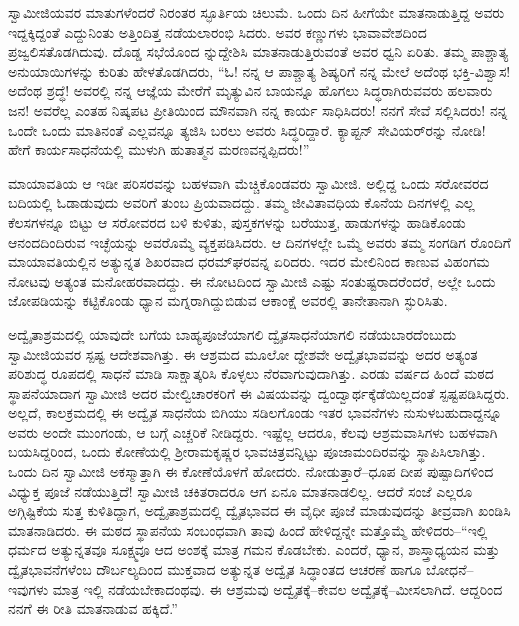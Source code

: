 ಸ್ವಾಮೀಜಿಯವರ ಮಾತುಗಳೆಂದರೆ ನಿರಂತರ ಸ್ಫೂರ್ತಿಯ ಚಿಲುಮೆ. ಒಂದು ದಿನ ಹೀಗೆಯೇ ಮಾತನಾಡುತ್ತಿದ್ದ ಅವರು ಇದ್ದಕ್ಕಿದ್ದಂತೆ ಎದ್ದುನಿಂತು ಅತ್ತಿಂದಿತ್ತ ನಡೆಯಲಾರಂಭಿ ಸಿದರು. ಅವರ ಕಣ್ಣುಗಳು ಭಾವಾವೇಶದಿಂದ ಪ್ರಜ್ವಲಿಸತೊಡಗಿದುವು. ದೊಡ್ಡ ಸಭೆಯೊಂದ ನ್ನುದ್ದೇಶಿಸಿ ಮಾತನಾಡುತ್ತಿರುವಂತೆ ಅವರ ಧ್ವನಿ ಏರಿತು. ತಮ್ಮ ಪಾಶ್ಚಾತ್ಯ ಅನುಯಾಯಿಗಳನ್ನು ಕುರಿತು ಹೇಳತೊಡಗಿದರು, “ಓ! ನನ್ನ ಆ ಪಾಶ್ಚಾತ್ಯ ಶಿಷ್ಯರಿಗೆ ನನ್ನ ಮೇಲೆ ಅದೆಂಥ ಭಕ್ತಿ-ವಿಶ್ವಾಸ! ಅದೆಂಥ ಶ್ರದ್ಧೆ! ಅವರಲ್ಲಿ ನನ್ನ ಆಜ್ಞೆಯ ಮೇರೆಗೆ ಮೃತ್ಯುವಿನ ಬಾಯನ್ನೂ ಹೊಗಲು ಸಿದ್ಧರಾಗಿರುವವರು ಹಲವಾರು ಜನ! ಅವರೆಲ್ಲ ಎಂತಹ ನಿಷ್ಕಪಟ ಪ್ರೀತಿಯಿಂದ ಮೌನವಾಗಿ ನನ್ನ ಕಾರ್ಯ ಸಾಧಿಸಿದರು! ನನಗೆ ಸೇವೆ ಸಲ್ಲಿಸಿದರು! ನನ್ನ ಒಂದೇ ಒಂದು ಮಾತಿನಂತೆ ಎಲ್ಲವನ್ನೂ ತ್ಯಜಿಸಿ ಬರಲು ಅವರು ಸಿದ್ಧರಿದ್ದಾರೆ. ಕ್ಯಾಪ್ಟನ್ ಸೇವಿಯರ್​ರನ್ನು ನೋಡಿ! ಹೇಗೆ ಕಾರ್ಯಸಾಧನೆಯಲ್ಲಿ ಮುಳುಗಿ ಹುತಾತ್ಮನ ಮರಣವನ್ನಪ್ಪಿದರು!”

ಮಾಯಾವತಿಯ ಆ ಇಡೀ ಪರಿಸರವನ್ನು ಬಹಳವಾಗಿ ಮೆಚ್ಚಿಕೊಂಡವರು ಸ್ವಾಮೀಜಿ. ಅಲ್ಲಿದ್ದ ಒಂದು ಸರೋವರದ ಬದಿಯಲ್ಲಿ ಓಡಾಡುವುದು ಅವರಿಗೆ ತುಂಬ ಪ್ರಿಯವಾದದ್ದು. ತಮ್ಮ ಜೀವಿತಾವಧಿಯ ಕೊನೆಯ ದಿನಗಳಲ್ಲಿ ಎಲ್ಲ ಕೆಲಸಗಳನ್ನೂ ಬಿಟ್ಟು ಆ ಸರೋವರದ ಬಳಿ ಕುಳಿತು, ಪುಸ್ತಕಗಳನ್ನು ಬರೆಯುತ್ತ, ಹಾಡುಗಳನ್ನು ಹಾಡಿಕೊಂಡು ಆನಂದದಿಂದಿರುವ ಇಚ್ಛೆಯನ್ನು ಅವರೊಮ್ಮೆ ವ್ಯಕ್ತಪಡಿಸಿದರು. ಆ ದಿನಗಳಲ್ಲೇ ಒಮ್ಮೆ ಅವರು ತಮ್ಮ ಸಂಗಡಿಗ ರೊಂದಿಗೆ ಮಾಯಾವತಿಯಲ್ಲಿನ ಅತ್ಯುನ್ನತ ಶಿಖರವಾದ ಧರಮ್​ಘರವನ್ನ ಏರಿದರು. ಇದರ ಮೇಲಿನಿಂದ ಕಾಣುವ ವಿಹಂಗಮ ನೋಟವು ಅತ್ಯಂತ ಮನೋಹರವಾದದ್ದು. ಈ ನೋಟದಿಂದ ಸ್ವಾಮೀಜಿ ಎಷ್ಟು ಸಂತುಷ್ಟರಾದರೆಂದರೆ, ಅಲ್ಲೇ ಒಂದು ಜೋಪಡಿಯನ್ನು ಕಟ್ಟಿಕೊಂಡು ಧ್ಯಾನ ಮಗ್ನರಾಗಿದ್ದುಬಿಡುವ ಆಕಾಂಕ್ಷೆ ಅವರಲ್ಲಿ ತಾನೇತಾನಾಗಿ ಸ್ಫುರಿಸಿತು.

ಅದ್ವೈತಾಶ್ರಮದಲ್ಲಿ ಯಾವುದೇ ಬಗೆಯ ಬಾಹ್ಯಪೂಜೆಯಾಗಲಿ ದ್ವೈತಸಾಧನೆಯಾಗಲಿ ನಡೆಯಬಾರದೆಂಬುದು ಸ್ವಾಮೀಜಿಯವರ ಸ್ಪಷ್ಟ ಆದೇಶವಾಗಿತ್ತು. ಈ ಆಶ್ರಮದ ಮೂಲೋ ದ್ದೇಶವೇ ಅದ್ವೈತಭಾವವನ್ನು ಅದರ ಅತ್ಯಂತ ಪರಿಶುದ್ಧ ರೂಪದಲ್ಲಿ ಸಾಧನೆ ಮಾಡಿ ಸಾಕ್ಷಾತ್ಕರಿಸಿ ಕೊಳ್ಳಲು ನೆರವಾಗುವುದಾಗಿತ್ತು. ಎರಡು ವರ್ಷದ ಹಿಂದೆ ಮಠದ ಸ್ಥಾಪನೆಯಾದಾಗ ಸ್ವಾಮೀಜಿ ಅದರ ಮೇಲ್ವಿಚಾರಕರಿಗೆ ಈ ವಿಷಯವನ್ನು ದ್ವಂದ್ವಾರ್ಥಕ್ಕೆಡೆಯಿಲ್ಲದಂತೆ ಸ್ಪಷ್ಟಪಡಿಸಿದ್ದರು. ಅಲ್ಲದೆ, ಕಾಲಕ್ರಮದಲ್ಲಿ ಈ ಅದ್ವೈತ ಸಾಧನೆಯ ಬಿಗಿಯು ಸಡಿಲಗೊಂಡು ಇತರ ಭಾವನೆಗಳು ನುಸುಳಬಹುದಾದ್ದನ್ನೂ ಅವರು ಅಂದೇ ಮುಂಗಂಡು, ಆ ಬಗ್ಗೆ ಎಚ್ಚರಿಕೆ ನೀಡಿದ್ದರು. ಇಷ್ಟೆಲ್ಲ ಆದರೂ, ಕೆಲವು ಆಶ್ರಮವಾಸಿಗಳು ಬಹಳವಾಗಿ ಬಯಸಿದ್ದರಿಂದ, ಒಂದು ಕೋಣೆಯಲ್ಲಿ ಶ್ರೀರಾಮಕೃಷ್ಣರ ಭಾವಚಿತ್ರವನ್ನಿಟ್ಟು ಪೂಜಾಮಂದಿರವನ್ನು ಸ್ಥಾಪಿಸಿಲಾಗಿತ್ತು. ಒಂದು ದಿನ ಸ್ವಾಮೀಜಿ ಅಕಸ್ಮಾತ್ತಾಗಿ ಈ ಕೋಣೆಯೊಳಗೆ ಹೋದರು. ನೋಡುತ್ತಾರೆ–ಧೂಪ ದೀಪ ಪುಷ್ಪಾದಿಗಳಿಂದ ವಿಧ್ಯುಕ್ತ ಪೂಜೆ ನಡೆಯುತ್ತಿದೆ! ಸ್ವಾಮೀಜಿ ಚಕಿತರಾದರೂ ಆಗ ಏನೂ ಮಾತನಾಡಲಿಲ್ಲ. ಆದರೆ ಸಂಜೆ ಎಲ್ಲರೂ ಅಗ್ಗಿಷ್ಟಿಕೆಯ ಸುತ್ತ ಕುಳಿತಿದ್ದಾಗ, ಅದ್ವೈತಾಶ್ರಮದಲ್ಲಿ ದ್ವೈತಭಾವದ ಈ ವೈಧೀ ಪೂಜೆ ಮಾಡುವುದನ್ನು ತೀವ್ರವಾಗಿ ಖಂಡಿಸಿ ಮಾತನಾಡಿದರು. ಈ ಮಠದ ಸ್ಥಾಪನೆಯ ಸಂಬಂಧವಾಗಿ ತಾವು ಹಿಂದೆ ಹೇಳಿದ್ದನ್ನೇ ಮತ್ತೊಮ್ಮೆ ಹೇಳಿದರು–“ಇಲ್ಲಿ ಧರ್ಮದ ಅತ್ಯುನ್ನತವೂ ಸೂಕ್ಷ್ಮವೂ ಆದ ಅಂಶಕ್ಕೆ ಮಾತ್ರ ಗಮನ ಕೊಡಬೇಕು. ಎಂದರೆ, ಧ್ಯಾನ, ಶಾಸ್ತ್ರಾಧ್ಯಯನ ಮತ್ತು ದ್ವೈತಭಾವನೆಗಳೆಂಬ ದೌರ್ಬಲ್ಯದಿಂದ ಮುಕ್ತವಾದ ಅತ್ಯುನ್ನತ ಅದ್ವೈತ ಸಿದ್ಧಾಂತದ ಆಚರಣೆ ಹಾಗೂ ಬೋಧನೆ–ಇವುಗಳು ಮಾತ್ರ ಇಲ್ಲಿ ನಡೆಯಬೇಕಾದಂಥವು. ಈ ಆಶ್ರಮವು ಅದ್ವೈತಕ್ಕೆ–ಕೇವಲ ಅದ್ವೈತಕ್ಕೆ–ಮೀಸಲಾಗಿದೆ. ಆದ್ದರಿಂದ ನನಗೆ ಈ ರೀತಿ ಮಾತನಾಡುವ ಹಕ್ಕಿದೆ.”

